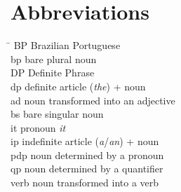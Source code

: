 \documentclass[output=paper,
modfonts
]{langscibook}
\begin{document}
\section*{Abbreviations}
\begin{tabbing}
	\hspace{2.5em} \= \kill 
	BP \> Brazilian Portuguese \\
	bp \>  bare plural noun \\
	DP \>  Definite Phrase \\
	dp \>  definite article (\textit{the}) + noun \\
	ad \>  noun transformed into an adjective \\
	bs \>  bare singular noun \\
	it \>  pronoun \textit{it} \\
	ip \>  indefinite article (\textit{a}/\textit{an}) + noun \\
	pdp \>  noun determined by a pronoun \\
	qp \>  noun determined by a quantifier \\
	verb \>  noun transformed into a verb \\
\end{tabbing}

{\sloppy
\printbibliography[heading=subbibliography,notkeyword=this]
}
\end{document}
